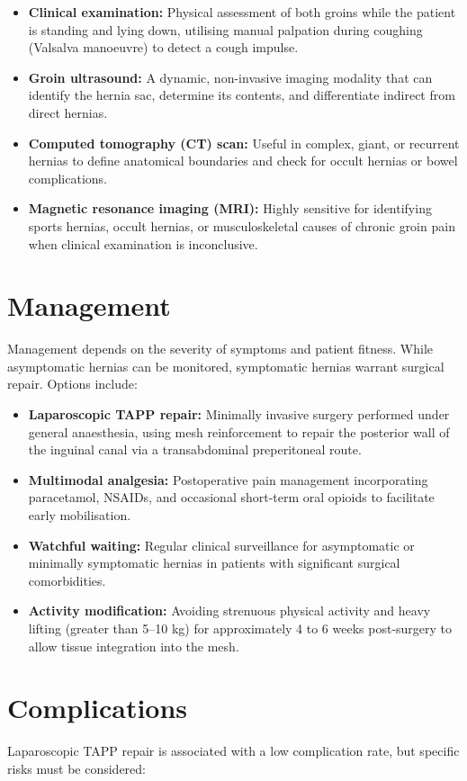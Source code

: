\begin{itemize}
    \item \textbf{Clinical examination:} Physical assessment of both groins while the patient is standing and lying down, utilising manual palpation during coughing (Valsalva manoeuvre) to detect a cough impulse.
    \item \textbf{Groin ultrasound:} A dynamic, non-invasive imaging modality that can identify the hernia sac, determine its contents, and differentiate indirect from direct hernias.
    \item \textbf{Computed tomography (CT) scan:} Useful in complex, giant, or recurrent hernias to define anatomical boundaries and check for occult hernias or bowel complications.
    \item \textbf{Magnetic resonance imaging (MRI):} Highly sensitive for identifying sports hernias, occult hernias, or musculoskeletal causes of chronic groin pain when clinical examination is inconclusive.
\end{itemize}

\section*{Management}
Management depends on the severity of symptoms and patient fitness. While asymptomatic hernias can be monitored, symptomatic hernias warrant surgical repair. Options include:

\begin{itemize}
    \item \textbf{Laparoscopic TAPP repair:} Minimally invasive surgery performed under general anaesthesia, using mesh reinforcement to repair the posterior wall of the inguinal canal via a transabdominal preperitoneal route.
    \item \textbf{Multimodal analgesia:} Postoperative pain management incorporating paracetamol, NSAIDs, and occasional short-term oral opioids to facilitate early mobilisation.
    \item \textbf{Watchful waiting:} Regular clinical surveillance for asymptomatic or minimally symptomatic hernias in patients with significant surgical comorbidities.
    \item \textbf{Activity modification:} Avoiding strenuous physical activity and heavy lifting (greater than 5--10 kg) for approximately 4 to 6 weeks post-surgery to allow tissue integration into the mesh.
\end{itemize}

\section*{Complications}
Laparoscopic TAPP repair is associated with a low complication rate, but specific risks must be considered:

